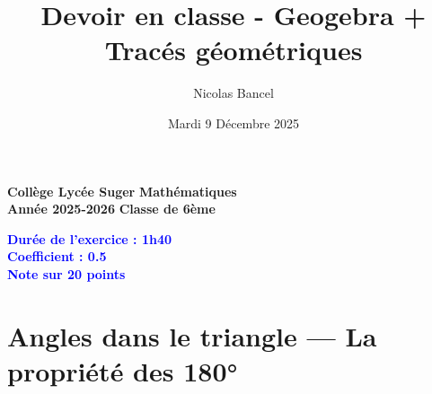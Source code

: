 \documentclass[answers]{exam}
\title{Devoir en classe - Geogebra + Tracés géométriques}
\author{Nicolas Bancel}
\date{Mardi 9 Décembre 2025}
\begin{document}
\textbf{Collège Lycée Suger}
\hfill
\textbf{Mathématiques} \\

\textbf{Année 2025-2026}
\hfill
\textbf{Classe de 6ème} \par

{\let\newpage\relax\maketitle}

\begin{tcolorbox}[
  colframe=blue!90!black,
  fonttitle=\bfseries,
  boxsep=4pt,
  sharp corners,
]
\begin{center}
\textbf{\textcolor{blue}{Durée de l'exercice : 1h40 \\
Coefficient : 0.5 \\
Note sur 20 points
}}
\end{center}
\end{tcolorbox}


\section*{Angles dans le triangle — La propriété des 180°}
\end{document}
